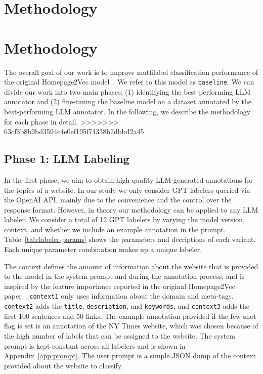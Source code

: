 \section{Methodology}\label{sec:methods}
\section{Methodology}
\label{sec:methodology}

The overall goal of our work is to improve mutlilabel classification performance of the original Homepage2Vec model~\cite{homepage2vec}. We refer to this model as \texttt{baseline}. We can divide our work into two main phases: (1) identifying the best-performing LLM annotator and (2) fine-tuning the baseline model on a dataset annotated by the best-performing LLM annotator. In the following, we describe the methodology for each phase in detail.
>>>>>>> 63cf3b8b9bd3594c4e0ef195f74338b7dbbd2a45

\subsection*{Phase 1: LLM Labeling}



In the first phase, we aim to obtain high-quality LLM-generated annotations for the topics of a website. 
In our study we only consider GPT labelers queried via the OpenAI API, mainly due to the convenience and the control over the response format. However, in theory our methodology can be applied to any LLM labeler. We consider a total of 12 GPT labelers by varying the model version, context, and whether we include an example annotation in the prompt. Table~\ref{tab:labeler-params} shows the parameters and decriptions of each variant. Each unique parameter combination makes up a unique labeler.

The context defines the amount of information about the website that is provided to the model in the system prompt and during the annotation process, and is inspired by the feature importance reported in the original Homepage2Vec paper~\cite{homepage2vec}. \texttt{context1} only uses information about the domain and meta-tags. \texttt{context2} adds the \texttt{title}, \texttt{description}, and \texttt{keywords}, and \texttt{context3} adds the first 100 sentences and 50 links. The example annotation provided if the few-shot flag is set is an annotation of the NY Times website, which was chosen because of the high number of labels that can be assigned to the website. The system prompt is kept constant across all labelers and is shown in Appendix~\ref{app:prompt}. The user prompt is a simple JSON dump of the context provided about the website to classify.

